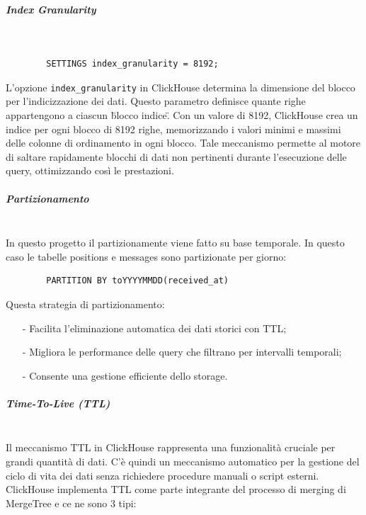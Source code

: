 \documentclass[10pt]{article}
\newcommand{\mysubparagraph}[1]{\subparagraph{#1}\mbox{}\\}
\begin{document}
        \mysubparagraph{Index Granularity}
        \begin{lstlisting}
        SETTINGS index_granularity = 8192;
        \end{lstlisting}
        L'opzione \texttt{index\_granularity} in ClickHouse determina la dimensione del blocco per l'indicizzazione dei dati.
        Questo parametro definisce quante righe appartengono a ciascun \"blocco indice\". Con un valore di 8192,
        ClickHouse crea un indice per ogni blocco di 8192 righe, memorizzando i valori minimi e massimi delle
        colonne di ordinamento in ogni blocco. Tale meccanismo permette al motore di saltare rapidamente blocchi di
        dati non pertinenti durante l'esecuzione delle query, ottimizzando così le prestazioni.



        \mysubparagraph{Partizionamento}
        In questo progetto il partizionamente viene fatto su base temporale. In questo caso le tabelle positions e messages sono partizionate per giorno:
        \begin{lstlisting}
        PARTITION BY toYYYYMMDD(received_at)
        \end{lstlisting}
        Questa strategia di partizionamento:
        \begin{itemize}
            \item[-] Facilita l'eliminazione automatica dei dati storici con TTL;
            \item[-] Migliora le performance delle query che filtrano per intervalli temporali;
            \item[-] Consente una gestione efficiente dello storage.
        \end{itemize}

        \mysubparagraph{Time-To-Live (TTL)}
        Il meccanismo TTL in ClickHouse rappresenta una funzionalità cruciale per grandi quantità di dati.
        C'è quindi un meccanismo automatico per la gestione del ciclo di vita dei dati senza richiedere procedure manuali o script esterni.
        ClickHouse implementa TTL come parte integrante del processo di merging di MergeTree e ce ne sono 3 tipi:
\end{document}
